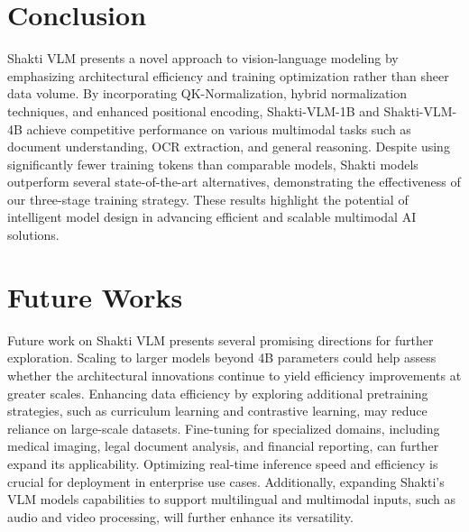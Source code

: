 \documentclass{article}
\begin{document}
\section{Conclusion }
Shakti VLM presents a novel approach to vision-language modeling by emphasizing architectural efficiency and training optimization rather than sheer data volume. By incorporating QK-Normalization\cite{henry2020querykeynormalizationtransformers}, hybrid normalization techniques, and enhanced positional encoding, Shakti-VLM-1B and Shakti-VLM-4B achieve competitive performance on various multimodal tasks such as document understanding, OCR extraction, and general reasoning. Despite using significantly fewer training tokens than comparable models, Shakti models outperform several state-of-the-art alternatives, demonstrating the effectiveness of our three-stage training strategy. These results highlight the potential of intelligent model design in advancing efficient and scalable multimodal AI solutions. 


\section{Future Works}
Future work on Shakti VLM presents several promising directions for further exploration. Scaling to larger models beyond 4B parameters could help assess whether the architectural innovations continue to yield efficiency improvements at greater scales. Enhancing data efficiency by exploring additional pretraining strategies, such as curriculum learning and contrastive learning, may reduce reliance on large-scale datasets. Fine-tuning for specialized domains, including medical imaging, legal document analysis, and financial reporting, can further expand its applicability. Optimizing real-time inference speed and efficiency is crucial for deployment in enterprise use cases. Additionally, expanding Shakti’s VLM models capabilities to support multilingual and multimodal inputs, such as audio and video processing, will further enhance its versatility. 

\clearpage


































  
  
\end{document}
